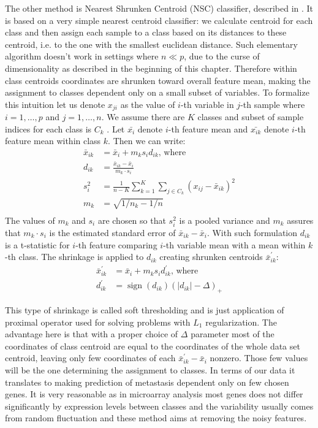 \documentclass[12pt, wide]{mwart}
\begin{document}
The other method is Nearest Shrunken Centroid (NSC) classifier, described in \cite{NSC}. It is based on a very simple nearest centroid classifier: we calculate centroid for each class and then assign each sample to a class based on its distances to these centroid, i.e. to the one with the smallest euclidean distance. Such elementary algorithm doesn't work in settings where $n \ll p$, due to the curse of dimensionality as described in the beginning of this chapter. Therefore within class centroids coordinates are shrunken toward overall feature mean, making the assignment to classes dependent only on a small subset of variables. To formalize this intuition let us denote $x_{ji}$ as the value of $i$-th variable in $j$-th sample where $i=1, \ldots, p$ and $j=1,\ldots,n$. We assume there are $K$ classes and subset of sample indices for each class is $C_k$ . Let $\bar{x_i}$ denote $i$-th feature mean and $\bar{x_{ik}}$ denote $i$-th feature mean within class $k$. Then we can write:
\begin{align*}
    \bar{x}_{i k}&=\bar{x}_{i}+m_{k} s_{i} d_{i k} \text{, where} \\
    d_{i k}&=\frac{\bar{x}_{i k}-\bar{x}_{i}}{m_{k} \cdot s_{i}} \\ 
    s_{i}^{2}&=\frac{1}{n-K} \sum_{k=1}^{K} \sum_{j \in C_{k}}\left(x_{i j}-\bar{x}_{i k}\right)^{2} \\
    m_{k}&=\sqrt{1 / n_{k}-1 / n} \\
\end{align*}
The values of $m_k$ and $s_i$ are chosen so that $s_i^2$ is a pooled variance and $m_k$ assures that $m_k \cdot s_i$ is the estimated standard error of $\bar{x}_{i k}-\bar{x}_{i}$. With such formulation $d_{ik}$ is a t-statistic for $i$-th feature comparing $i$-th variable mean with a mean within $k$-th class. The shrinkage is applied to $d_{ik}$ creating shrunken centroids $\bar{x}_{ik}^{\prime}$:
\begin{align*}
    \bar{x}_{i k}^{\prime}&=\bar{x}_{i}+m_{k} s_{i} d_{i k}^{\prime} \text{, where} \\
    d_{i k}^{\prime}&=\operatorname{sign}\left(d_{i k}\right)\left(\left|d_{i k}\right|-\Delta\right)_{+}
\end{align*}

This type of shrinkage is called soft thresholding and is just application of proximal operator used for solving problems with $L_1$ regularization. The advantage here is that with a proper choice of $\Delta$ parameter most of the coordinates of class centroid are equal to the coordinates of the whole data set centroid, leaving only few coordinates of each $\bar{x}_{i k}^{\prime} - \bar{x}_{i}$ nonzero. Those few values will be the one determining the assignment to classes. In terms of our data it translates to making prediction of metastasis dependent only on few chosen genes. It is very reasonable as in microarray analysis most genes does not differ significantly by expression levels between classes and the variability usually comes from random fluctuation and these method aims at removing the noisy features.
\end{document}
